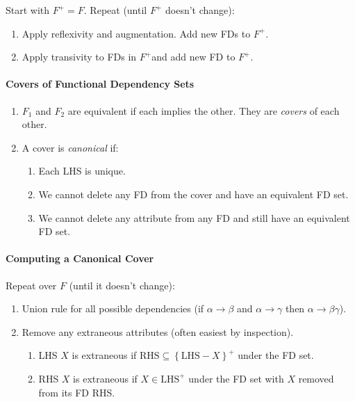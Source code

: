 \documentclass[twocolumn,english]{article}
\begin{document}
Start with $F^{+}=F$. Repeat (until $F^{+}$ doesn't change): 
\begin{enumerate}
\item Apply reflexivity and augmentation. Add new FDs to $F^{+}$. 
\item Apply transivity to FDs in $F^{+}$and add new FD to $F^{+}$. 
\end{enumerate}

\paragraph{Covers of Functional Dependency Sets}
\begin{enumerate}
\item $F_{1}$ and $F_{2}$ are equivalent if each implies the other. They
are \emph{covers} of each other. 
\item A cover is \emph{canonical} if:

\begin{enumerate}
\item Each LHS is unique. 
\item We cannot delete any FD from the cover and have an equivalent FD set. 
\item We cannot delete any attribute from any FD and still have an equivalent
FD set. 
\end{enumerate}
\end{enumerate}

\paragraph{Computing a Canonical Cover}

Repeat over $F$ (until it doesn't change): 
\begin{enumerate}
\item Union rule for all possible dependencies (if $\alpha\rightarrow\beta$
and $\alpha\rightarrow\gamma$ then $\alpha\rightarrow\beta\gamma$). 
\item Remove any extraneous attributes (often easiest by inspection).

\begin{enumerate}
\item LHS $X$ is extraneous if $\mbox{RHS}\subseteq\left\{ \mbox{LHS}-X\right\} ^{+}$
under the FD set. 
\item RHS $X$ is extraneous if $X\in\mbox{LHS}^{+}$ under the FD set with
$X$ removed from its FD RHS. 
\end{enumerate}
\end{enumerate}
\end{document}
